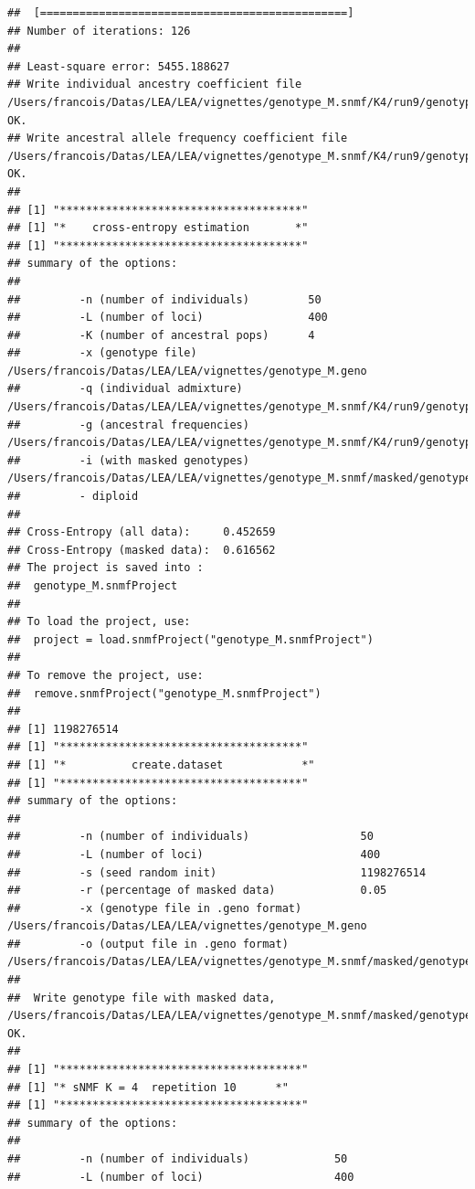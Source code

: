 \documentclass[12pt,a4paper,oneside]{article}\usepackage[]{graphicx}\usepackage[]{color}
\makeatletter
\newenvironment{kframe}{%
 \def\at@end@of@kframe{}%
 \ifinner\ifhmode%
  \def\at@end@of@kframe{\end{minipage}}%
  \begin{minipage}{\columnwidth}%
 \fi\fi%
 \def\FrameCommand##1{\hskip\@totalleftmargin \hskip-\fboxsep
 \colorbox{shadecolor}{##1}\hskip-\fboxsep
     \hskip-\linewidth \hskip-\@totalleftmargin \hskip\columnwidth}%
 \MakeFramed {\advance\hsize-\width
   \@totalleftmargin\z@ \linewidth\hsize
   \@setminipage}}%
 {\par\unskip\endMakeFramed%
 \at@end@of@kframe}
\newenvironment{knitrout}{}{} %
\makeatother
\begin{document}
\begin{knitrout}
\begin{kframe}
\begin{verbatim}
## 	[===============================================]
## Number of iterations: 126
## 
## Least-square error: 5455.188627
## Write individual ancestry coefficient file /Users/francois/Datas/LEA/LEA/vignettes/genotype_M.snmf/K4/run9/genotype_M_r9.4.Q:		OK.
## Write ancestral allele frequency coefficient file /Users/francois/Datas/LEA/LEA/vignettes/genotype_M.snmf/K4/run9/genotype_M_r9.4.G:	OK.
## 
## [1] "*************************************"
## [1] "*    cross-entropy estimation       *"
## [1] "*************************************"
## summary of the options:
## 
##         -n (number of individuals)         50
##         -L (number of loci)                400
##         -K (number of ancestral pops)      4
##         -x (genotype file)                 /Users/francois/Datas/LEA/LEA/vignettes/genotype_M.geno
##         -q (individual admixture)          /Users/francois/Datas/LEA/LEA/vignettes/genotype_M.snmf/K4/run9/genotype_M_r9.4.Q
##         -g (ancestral frequencies)         /Users/francois/Datas/LEA/LEA/vignettes/genotype_M.snmf/K4/run9/genotype_M_r9.4.G
##         -i (with masked genotypes)         /Users/francois/Datas/LEA/LEA/vignettes/genotype_M.snmf/masked/genotype_M_I.geno
##         - diploid
## 
## Cross-Entropy (all data):	 0.452659
## Cross-Entropy (masked data):	 0.616562
## The project is saved into :
##  genotype_M.snmfProject 
## 
## To load the project, use:
##  project = load.snmfProject("genotype_M.snmfProject")
## 
## To remove the project, use:
##  remove.snmfProject("genotype_M.snmfProject")
## 
## [1] 1198276514
## [1] "*************************************"
## [1] "*          create.dataset            *"
## [1] "*************************************"
## summary of the options:
## 
##         -n (number of individuals)                 50
##         -L (number of loci)                        400
##         -s (seed random init)                      1198276514
##         -r (percentage of masked data)             0.05
##         -x (genotype file in .geno format)         /Users/francois/Datas/LEA/LEA/vignettes/genotype_M.geno
##         -o (output file in .geno format)           /Users/francois/Datas/LEA/LEA/vignettes/genotype_M.snmf/masked/genotype_M_I.geno
## 
##  Write genotype file with masked data, /Users/francois/Datas/LEA/LEA/vignettes/genotype_M.snmf/masked/genotype_M_I.geno:		OK.
## 
## [1] "*************************************"
## [1] "* sNMF K = 4  repetition 10      *"
## [1] "*************************************"
## summary of the options:
## 
##         -n (number of individuals)             50
##         -L (number of loci)                    400

\end{verbatim}
\end{kframe}
\end{knitrout}
\end{document}
